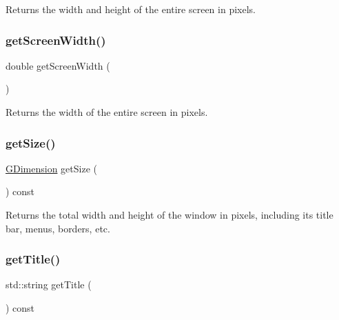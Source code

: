 Returns the width and height of the entire screen in pixels. 

\mbox{\label{classGWindow_adc82933bd579ab83d7cd4e3bc5f79a12}} 
\subsubsection{\texorpdfstring{get\+Screen\+Width()}{getScreenWidth()}}
{\footnotesize\ttfamily double get\+Screen\+Width (\begin{DoxyParamCaption}{ }\end{DoxyParamCaption})\hspace{0.3cm}{\ttfamily [static]}}



Returns the width of the entire screen in pixels. 

\mbox{\label{classGWindow_a7b4eec96a2bdc6420695d5796a78eea9}} 
\subsubsection{\texorpdfstring{get\+Size()}{getSize()}}
{\footnotesize\ttfamily \mbox{\hyperlink{classGDimension}{G\+Dimension}} get\+Size (\begin{DoxyParamCaption}{ }\end{DoxyParamCaption}) const\hspace{0.3cm}{\ttfamily [virtual]}}



Returns the total width and height of the window in pixels, including its title bar, menus, borders, etc. 

\mbox{\label{classGWindow_abc7651e67987c4682fed77d92a860bba}} 
\subsubsection{\texorpdfstring{get\+Title()}{getTitle()}}
{\footnotesize\ttfamily std\+::string get\+Title (\begin{DoxyParamCaption}{ }\end{DoxyParamCaption}) const\hspace{0.3cm}{\ttfamily [virtual]}}



